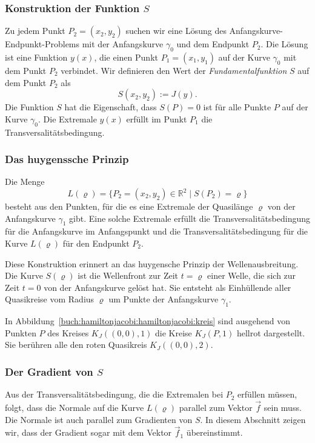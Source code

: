 %
%
\subsubsection{Konstruktion der Funktion $S$}
Zu jedem Punkt $P_2=(x_2,y_2)$ suchen wir eine Lösung des
Anfangskurve-Endpunkt-Problems mit der Anfangskurve $\gamma_0$
und dem Endpunkt $P_2$.
Die Lösung ist eine Funktion $y(x)$, die einen Punkt $P_1=(x_1,y_1)$ auf der
Kurve $\gamma_0$ mit dem Punkt $P_2$ verbindet.
Wir definieren den Wert der {\em Fundamentalfunktion} $S$ auf dem
%
Punkt $P_2$ als
\begin{equation}
S(x_2,y_2)
:=
J(y).
\label{buch:hamiltonjacobi:jacobi:eqn:Sdef}
\end{equation}
Die Funktion $S$ hat die Eigenschaft, dass $S(P)=0$ ist für alle
Punkte $P$ auf der Kurve $\gamma_0$.
Die Extremale $y(x)$ erfüllt im Punkt $P_1$ die Transversalitätsbedingung.

%
%
\subsubsection{Das huygenssche Prinzip}
%
%
Die Menge 
\[
L(\varrho)
=
\{
P_2=(x_2,y_2)\in\mathbb{R}^2
\mid
S(P_2)=\varrho
\}
\]
besteht aus den Punkten, für die es eine Extremale der Quasilänge
$\varrho$ von der Anfangskurve $\gamma_1$ gibt.
Eine solche Extremale erfüllt die Transversalitätsbedingung für die
Anfangskurve im Anfangspunkt und die Transversalitätsbedingung
für die Kurve $L(\varrho)$ für den Endpunkt $P_2$.

Diese Konstruktion erinnert an das huygensche Prinzip der Wellenausbreitung.
Die Kurve $S(\varrho)$ ist die Wellenfront zur Zeit $t=\varrho$ einer Welle,
die sich zur Zeit $t=0$ von der Anfangskurve gelöst hat.
Sie entsteht als Einhüllende aller Quasikreise vom Radius $\varrho$ 
um Punkte der Anfangskurve $\gamma_1$.

\begin{beispiel}
In Abbildung~\ref{buch:hamiltonjacobi:hamiltonjacobi:kreis} sind
ausgehend von Punkten $P$ des Kreises $K_J((0,0),1)$ die Kreise
$K_J(P,1)$ hellrot dargestellt.
Sie berühren alle den roten Quasikreis $K_J((0,0),2)$.
\end{beispiel}

%
%
\subsubsection{Der Gradient von $S$}
Aus der Transversalitätsbedingung, die die Extremalen bei $P_2$ erfüllen
müssen, folgt, dass die Normale auf die Kurve $L(\varrho)$ parallel
zum Vektor $\vec{f}$ sein muss.
Die Normale ist auch parallel zum Gradienten von $S$.
In diesem Abschnitt zeigen wir, dass der Gradient sogar mit dem 
Vektor $\vec{f}_1$ übereinstimmt.

